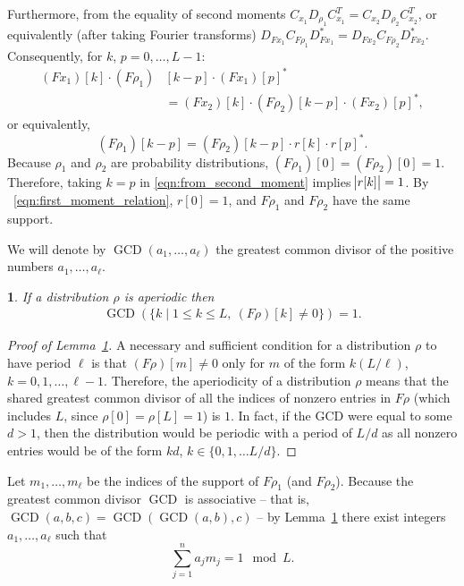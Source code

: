 \documentclass{IEEEtran}
\numberwithin{equation}{section}
\numberwithin{figure}{section}
\theoremstyle{plain}
\theoremstyle{definition}
\theoremstyle{remark}
\theoremstyle{plain}
\newtheorem{lem}[thm]{\protect\lemmaname}
\theoremstyle{remark}
\theoremstyle{plain}
\theoremstyle{plain}
\theoremstyle{remark}
\providecommand{\lemmaname}{Lemma}
\newcommand{\F}{F}
\begin{document}
Furthermore, from the equality of second moments $C_{x_1} D_{\rho_1} C_{x_1}^T = C_{x_2} D_{\rho_2} C_{x_2}^T $, or equivalently (after taking Fourier transforms) $D_{\F x_1} C_{\F \rho_1} D_{\F x_1}^* = D_{\F x_2} C_{\F \rho_2} D_{\F x_2}^*$. Consequently, for $k$, $p =0,\ldots ,L-1$:
%
\begin{align*} %
%
    (\F x_1)[k] \cdot  (\F\rho_1) & [k-p] \cdot (\F x_1)[p]^\ast   \nonumber \\
                           &= (\F x_2)[k] \cdot (\F \rho_2)[k-p]\cdot  (\F x_2)[p]^\ast , 
\end{align*}
%
or equivalently,
%
\begin{equation} \label{eqn:from_second_moment}
%
(\F\rho_1)[k-p] = (\F \rho_2)[k-p] \cdot r[k] \cdot r[p]^\ast.
%
\end{equation}
%
Because $\rho_1$ and $\rho_2$ are probability distributions, $(\F\rho_1)[0] = (\F\rho_2)[0]=1$. Therefore, taking $k=p$ in \eqref{eqn:from_second_moment} implies $\abs{r[k]}=1$. By ~\eqref{eqn:first_moment_relation}, $r[0] = 1$, and $\F \rho_1$ and $\F \rho_2$ have the same support.



We will denote by $ \operatorname{GCD}\left(a_1,\dots,a_\ell \right)$ the greatest common divisor of the positive numbers $a_1,\dots,a_\ell$.

\begin{lem} \label{lemma:aperiodicCond}
If a distribution $\rho$ is aperiodic then
%
\begin{align*}
%
    \operatorname{GCD}\left( \{ k \mid 1\le k \le L , \ (\F \rho)[k]\neq 0 \} \right) = 1 .
%
\end{align*}
\end{lem}
\begin{proof}[Proof of Lemma~\ref{lemma:aperiodicCond}]
%
A necessary and sufficient condition for a distribution $\rho$ to have period $\ell$ is that $(\F \rho)[m] \neq 0$ only for $m$ of the form $ k (L/\ell)$, $k=0,1,\ldots,\ell-1$. Therefore, the aperiodicity of a distribution $\rho$ means that the shared greatest common divisor of all the indices of nonzero entries in $\F\rho$ (which includes $L$, since $\rho[0]= \rho[L]=1$) is $1$. In fact, if the GCD were equal to some $d>1$, then the distribution would be periodic with a period of $ L/d $ as all nonzero entries would be of the form $kd$, $k\in\{0,1,\ldots L/d\}$.
%
\end{proof}

Let $m_1,\dots,m_\ell$ be the indices of the support of $\F \rho_1$ (and $\F \rho_2$). Because the greatest common divisor $ \operatorname{GCD}$ is associative -- that is, $ \operatorname{GCD}(a,b,c) = \operatorname{GCD}(\operatorname{GCD}(a,b),c)$ -- by Lemma~\ref{lemma:aperiodicCond} there exist integers $a_1,\ldots,a_\ell$ such that
%
\begin{equation} \label{eqn:sum_of_nonzeros_indices}
%
    \sum_{j=1}^n a_j m_j = 1  \mod L .
%
\end{equation}
\end{document}
